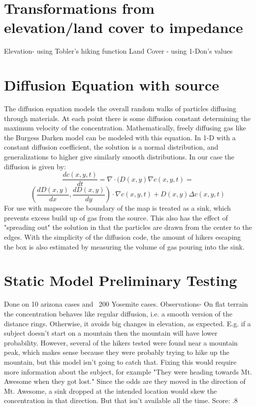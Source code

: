 \documentclass[]{article}
\begin{document}
\section{Transformations from elevation/land cover to impedance}
Elevation- using Tobler's hiking function
Land Cover - using 1-Don's values
\section{Diffusion Equation with source}
The diffusion equation models the overall random walks of particles diffusing through materials. At each point there is some diffusion constant determining the maximum velocity of the concentration. Mathematically, freely diffusing gas like the Burgess Darken model can be modeled with this equation. In 1-D with a constant diffusion coefficient, the solution is a normal distribution, and generalizations to higher give similarly smooth distributions. In our case the diffusion is given by:
\[\frac{dc(x,y,t)}{dt}=\nabla \cdot(D(x,y)\nabla c(x,y,t)=\]
\[(\frac{dD(x,y)}{dx},\frac{dD(x,y)}{dy})\cdot\nabla c(x,y,t) + D(x,y)\Delta c(x,y,t)\]
For use with mapscore the boundary of the map is treated as a sink, which prevents excess build up of gas from the source. This also has the effect of "spreading out" the solution in that the particles are drawn from the center to the edges. With the simplicity of the diffusion code, the amount of hikers escaping the box is also estimated by measuring the volume of gas pouring into the sink.

\section{Static Model Preliminary Testing}
Done on 10 arizona cases and ~200 Yosemite cases. Observations- On flat terrain the concentration behaves like regular diffusion, i.e. a smooth version of the distance rings. Otherwise, it avoids big changes in elevation, as expected. E.g. if a subject doesn't start on a mountain then the mountain will have lower probability. However, several of the hikers tested were found near a mountain peak, which makes sense because they were probably trying to hike up the mountain, but this model isn't going to catch that. Fixing this would require more information about the subject, for example "They were heading towards Mt. Awesome when they got lost." Since the odds are they moved in the direction of Mt. Awesome, a sink dropped at the intended location would skew the concentration in that direction. But that isn't available all the time. Score: .8
\end{document}
